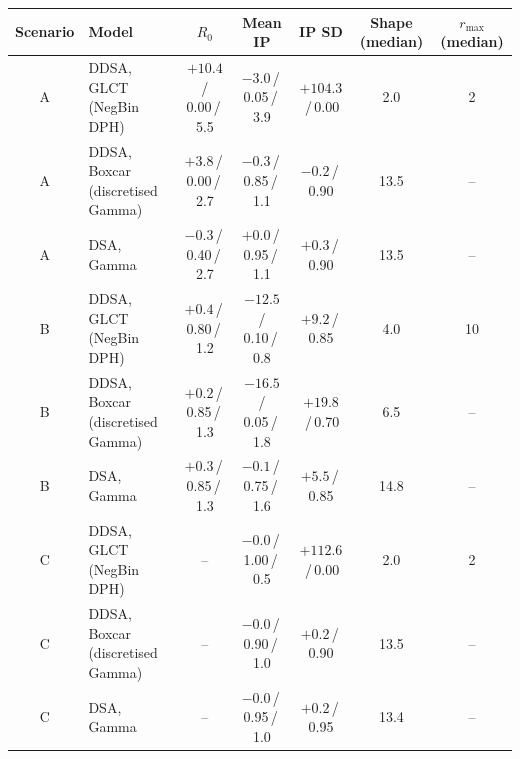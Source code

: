 \begin{tabular}{c l c c c c c}
\toprule
Scenario & Model & $R_0$ & Mean IP & IP SD & Shape (median) & $r_{\max}$ (median) \\
\midrule
A & DDSA, GLCT (NegBin DPH) & ${+}10.4$\,/\,0.00\,/\,5.5 & $-3.0$\,/\,0.05\,/\,3.9 & ${+}104.3$\,/\,0.00 & 2.0 & 2 \\
A & DDSA, Boxcar (discretised Gamma) & ${+}3.8$\,/\,0.00\,/\,2.7 & $-0.3$\,/\,0.85\,/\,1.1 & $-0.2$\,/\,0.90 & 13.5 & -- \\
A & DSA, Gamma & $-0.3$\,/\,0.40\,/\,2.7 & ${+}0.0$\,/\,0.95\,/\,1.1 & ${+}0.3$\,/\,0.90 & 13.5 & -- \\
\midrule
B & DDSA, GLCT (NegBin DPH) & ${+}0.4$\,/\,0.80\,/\,1.2 & $-12.5$\,/\,0.10\,/\,0.8 & ${+}9.2$\,/\,0.85 & 4.0 & 10 \\
B & DDSA, Boxcar (discretised Gamma) & ${+}0.2$\,/\,0.85\,/\,1.3 & $-16.5$\,/\,0.05\,/\,1.8 & ${+}19.8$\,/\,0.70 & 6.5 & -- \\
B & DSA, Gamma & ${+}0.3$\,/\,0.85\,/\,1.3 & $-0.1$\,/\,0.75\,/\,1.6 & ${+}5.5$\,/\,0.85 & 14.8 & -- \\
\midrule
C & DDSA, GLCT (NegBin DPH) & -- & $-0.0$\,/\,1.00\,/\,0.5 & ${+}112.6$\,/\,0.00 & 2.0 & 2 \\
C & DDSA, Boxcar (discretised Gamma) & -- & $-0.0$\,/\,0.90\,/\,1.0 & ${+}0.2$\,/\,0.90 & 13.5 & -- \\
C & DSA, Gamma & -- & $-0.0$\,/\,0.95\,/\,1.0 & ${+}0.2$\,/\,0.95 & 13.4 & -- \\
\bottomrule
\end{tabular}
